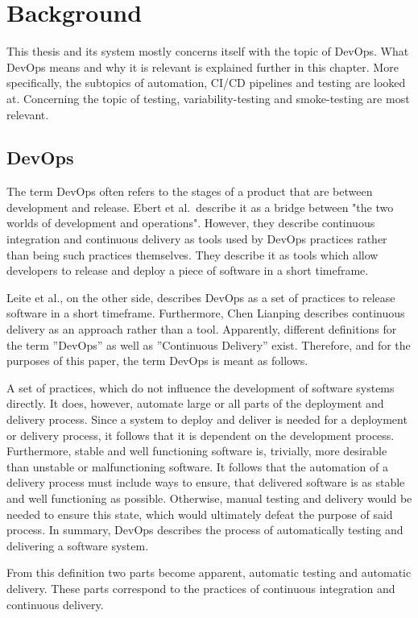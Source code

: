 \chapter{Background}\label{ch:background}

This thesis and its system mostly concerns itself with the topic of DevOps.
What DevOps means and why it is relevant is explained further in this chapter.
More specifically, the subtopics of automation, CI/CD pipelines and testing are looked at.
Concerning the topic of testing, variability-testing and smoke-testing are most relevant.

\section{DevOps}\label{sec:devops}

The term DevOps often refers to the stages of a product that are between development and release.
Ebert et al.\ describe it as a bridge between "the two worlds of development and operations"\cite{DevOps}.
However, they describe continuous integration and continuous delivery as tools used by DevOps practices rather than being such practices themselves.
They describe it as tools which allow developers to release and deploy a piece of software in a short timeframe.

Leite et al., on the other side, describes DevOps as a set of practices to release software in a short timeframe\cite{ASurveyofDevOpsConceptsandChallenges}.
Furthermore, Chen Lianping describes continuous delivery as an approach rather than a tool\cite{ContinuousDeliveryHugeBenefitsButChallengesToo}.
Apparently, different definitions for the term ''DevOps'' as well as ''Continuous Delivery'' exist.
Therefore, and for the purposes of this paper, the term DevOps is meant as follows.

A set of practices, which do not influence the development of software systems directly.
It does, however, automate large or all parts of the deployment and delivery process.
Since a system to deploy and deliver is needed for a deployment or delivery process, it follows that it is dependent on the development process.
Furthermore, stable and well functioning software is, trivially, more desirable than unstable or malfunctioning software.
It follows that the automation of a delivery process must include ways to ensure, that delivered software is as stable and well functioning as possible.
Otherwise, manual testing and delivery would be needed to ensure this state, which would ultimately defeat the purpose of said process.
In summary, DevOps describes the process of automatically testing and delivering a software system.

From this definition two parts become apparent, automatic testing and automatic delivery.
These parts correspond to the practices of continuous integration and continuous delivery.

